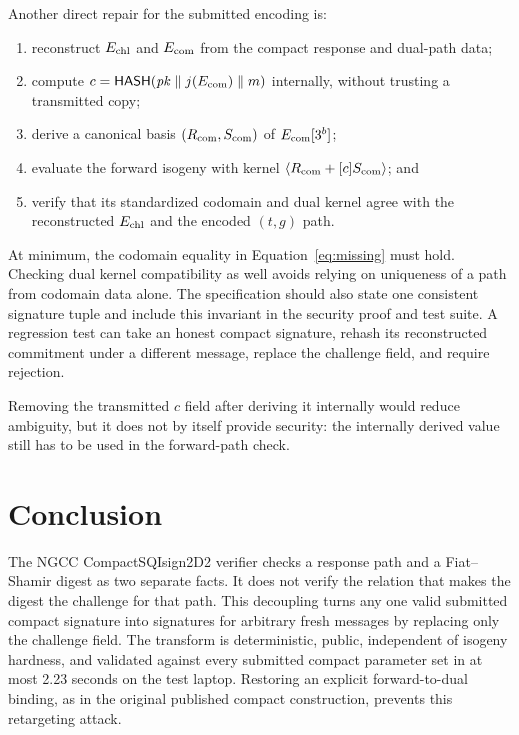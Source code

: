 \documentclass[11pt,a4paper]{article}
\newcommand{\Hash}{\mathsf{HASH}}
\begin{document}
Another direct repair for the submitted encoding is:
\begin{enumerate}[leftmargin=1.7em]
  \item reconstruct $E_{\rm chl}$ and $E_{\rm com}$ from the compact response and dual-path
        data;
  \item compute $c=\Hash(\mathit{pk}\parallel j(E_{\rm com})\parallel m)$ internally, without
        trusting a transmitted copy;
  \item derive a canonical basis $(R_{\rm com},S_{\rm com})$ of $E_{\rm com}[3^b]$;
  \item evaluate the forward isogeny with kernel
        $\langle R_{\rm com}+[c]S_{\rm com}\rangle$; and
  \item verify that its standardized codomain and dual kernel agree with the reconstructed
        $E_{\rm chl}$ and the encoded $(t,g)$ path.
\end{enumerate}

At minimum, the codomain equality in Equation~\eqref{eq:missing} must hold.  Checking dual
kernel compatibility as well avoids relying on uniqueness of a path from codomain data alone.
The specification should also state one consistent signature tuple and include this invariant in
the security proof and test suite.  A regression test can take an honest compact signature,
rehash its reconstructed commitment under a different message, replace the challenge field, and
require rejection.

Removing the transmitted $c$ field after deriving it internally would reduce ambiguity, but it
does not by itself provide security: the internally derived value still has to be used in the
forward-path check.

\section{Conclusion}

The NGCC CompactSQIsign2D2 verifier checks a response path and a Fiat--Shamir digest as two
separate facts.  It does not verify the relation that makes the digest the challenge for that path.
This decoupling turns any one valid submitted compact signature into signatures for arbitrary
fresh messages by replacing only the challenge field.  The transform is deterministic, public,
independent of isogeny hardness, and validated against every submitted compact parameter set
in at most 2.23 seconds on the test laptop.  Restoring an explicit forward-to-dual binding, as in
the original published compact construction, prevents this retargeting attack.
\end{document}
